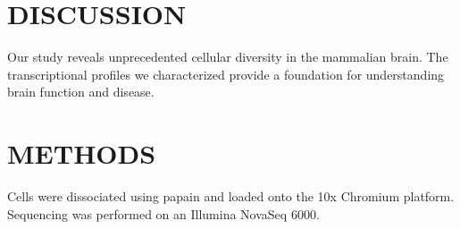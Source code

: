 \documentclass{nature}
\begin{document}
\section{DISCUSSION}

Our study reveals unprecedented cellular diversity in the mammalian brain.
The transcriptional profiles we characterized provide a foundation for
understanding brain function and disease.

\section{METHODS}

Cells were dissociated using papain and loaded onto the 10x Chromium platform.
Sequencing was performed on an Illumina NovaSeq 6000.

\printbibliography
\end{document}

